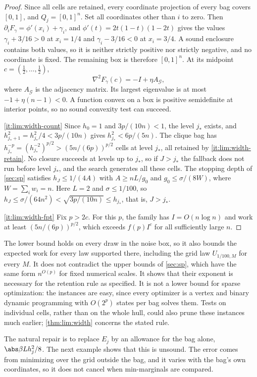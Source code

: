 \begin{proof}
Since all cells are retained, every coordinate projection of every bag
covers $[0,1]$, and $Q_j=[0,1]^n$. Set all coordinates other than $i$ to
zero. Then $\partial_iF_\gamma=\phi'(x_i)+\gamma_i$, and
$\phi'(t)=2t(1-t)(1-2t)$ gives the values $\gamma_i+3/16>0$ at $x_i=1/4$
and $\gamma_i-3/16<0$ at $x_i=3/4$. A sound enclosure contains both values,
so it is neither strictly positive nor strictly negative, and no coordinate
is fixed. The remaining box is therefore $[0,1]^n$. At its midpoint
$c=(\frac12,\ldots,\frac12)$,
\[
 \nabla^2F_\gamma(c)=-I+\eta A_{\mathcal G},
\]
where $A_{\mathcal G}$ is the adjacency matrix. Its largest eigenvalue is at
most $-1+\eta(n-1)<0$. A function convex on a box is positive semidefinite
at interior points, so no sound convexity test can succeed.

\ref{it:lim:width-count}
Since $h_0=1$ and $3p/(10n)<1$, the level $j_*$ exists, and
$h_{j_*+1}^2=h_{j_*}^2/4<3p/(10n)$ gives $h_{j_*}^2<6p/(5n)$. The clique bag
has $h_{j_*}^{-p}=(h_{j_*}^{-2})^{p/2}>(5n/(6p))^{p/2}$ cells at level
$j_*$, all retained by \ref{it:lim:width-retain}. No closure succeeds at
levels up to $j_*$, so if $J>j_*$ the fallback does not run before level
$j_*$, and the search generates all these cells. The stopping depth of
\cref{sec:sp} satisfies $h_J\le1/(4A)$ with $A\ge nL/g_0$ and
$g_0\le\sigma/(8W)$, where $W=\sum_iw_i=n$. Here $L=2$ and $\sigma\le1/100$,
so $h_J\le\sigma/(64n^2)<\sqrt{3p/(10n)}\le h_{j_*}$, that is, $J>j_*$.

\ref{it:lim:width-fpt}
Fix $p>2c$. For this $p$, the family has $I=O(n\log n)$ and work at least
$(5n/(6p))^{p/2}$, which exceeds $f(p)I^c$ for all sufficiently large $n$.
\end{proof}

The lower bound holds on every draw in the noise box, so it also bounds the
expected work for every law supported there, including the grid law
$U_{1/100,M}$ for every $M$. It does not contradict the upper bounds of
\cref{sec:sp}, which have the same form $n^{O(p)}$ for fixed numerical
scales. It shows that their exponent is necessary for the retention rule as
specified. It is not a lower bound for sparse optimization: the instances
are easy, since every optimizer is a vertex and binary dynamic programming
with $O(2^p)$ states per bag solves them. Tests on individual cells, rather
than on the whole hull, could also prune these instances much earlier;
\cref{thm:lim:width} concerns the stated rule.

The natural repair is to replace $E_j$ by an allowance for the bag alone,
$\abs\beta Lh_j^2/8$. The next example shows that this is unsound. The error
comes from minimizing over the grid outside the bag, and it varies with the
bag's own coordinates, so it does not cancel when min-marginals are
compared.


